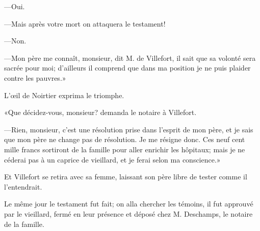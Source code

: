 —Oui. 

—Mais après votre mort on attaquera le testament! 

—Non. 

—Mon père me connaît, monsieur, dit M. de Villefort, il sait que sa volonté sera sacrée pour moi; d'ailleurs il comprend que dans ma position je ne puis plaider contre les pauvres.» 

L'œil de Noirtier exprima le triomphe. 

«Que décidez-vous, monsieur? demanda le notaire à Villefort. 

—Rien, monsieur, c'est une résolution prise dans l'esprit de mon père, et je sais que mon père ne change pas de résolution. Je me résigne donc. Ces neuf cent mille francs sortiront de la famille pour aller enrichir les hôpitaux; mais je ne céderai pas à un caprice de vieillard, et je ferai selon ma conscience.» 

Et Villefort se retira avec sa femme, laissant son père libre de tester comme il l'entendrait. 

Le même jour le testament fut fait; on alla chercher les témoins, il fut approuvé par le vieillard, fermé en leur présence et déposé chez M. Deschamps, le notaire de la famille. 